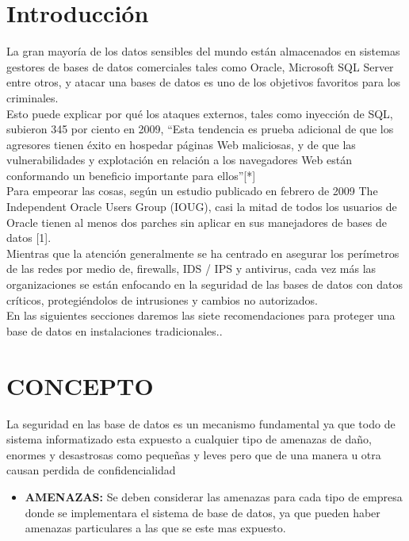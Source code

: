 \documentclass[conference]{IEEEtran}
\begin{document}
\section{Introducci\'on}
La gran mayoría de los datos sensibles del mundo están almacenados en sistemas gestores de bases de datos comerciales tales como Oracle, Microsoft SQL Server entre otros, y atacar una bases de datos es uno de los objetivos favoritos para los criminales.
\\
Esto puede explicar por qué los ataques externos, tales como inyección de SQL, subieron 345 por ciento en 2009, “Esta tendencia es prueba adicional de que los agresores tienen éxito en hospedar páginas Web maliciosas, y de que las vulnerabilidades y explotación en relación a los navegadores Web están conformando un beneficio importante para ellos”[*]
\\
Para empeorar las cosas, según un estudio publicado en febrero de 2009 The Independent Oracle Users Group (IOUG), casi la mitad de todos los usuarios de Oracle tienen al menos dos parches sin aplicar en sus manejadores de bases de datos [1].
\\
 Mientras que la atención generalmente se ha centrado en asegurar los perímetros de las redes por medio de, firewalls, IDS / IPS y antivirus, cada vez más las organizaciones se están enfocando en la seguridad de las bases de datos con datos críticos, protegiéndolos de intrusiones y cambios no autorizados.
\\
En las siguientes secciones daremos las siete recomendaciones para proteger una base de datos en instalaciones tradicionales..
\\

\section{CONCEPTO}

La seguridad en las base de datos es un mecanismo fundamental ya que todo de sistema informatizado esta expuesto a cualquier tipo de amenazas de daño, enormes y desastrosas como pequeñas y leves pero que de una manera u otra causan perdida de confidencialidad
\\
\begin{itemize}
\item \textbf{AMENAZAS:} Se deben considerar las amenazas para cada tipo de empresa donde se implementara el sistema de base de datos, ya que pueden haber amenazas particulares a las que se este mas expuesto.
\end{itemize}
\end{document}
